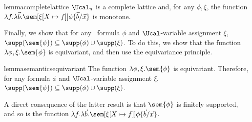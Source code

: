 \begin{restatable}{lemma}{completelattice}\label{lem:completelattice}
$\Ucal_n$ is a complete lattice and,
for any $\phi, \xi$,
 the function $\lambda f.\lambda \vec b.\sem[{\xi[X\mapsto f]}]{\phi\{\vec b/\vec x\}}$ is monotone.
\end{restatable}

Finally, we show that for any \fhml\ formula $\phi$ and $\Ucal$-variable assignment $\xi$,  $\supp(\sem{\phi}) \subseteq \supp(\phi) \cup \supp(\xi)$. 
To do this, we show that the function $\lambda \phi, \xi.\sem{\phi}$ is equivariant, and then use the equivariance principle.

\begin{restatable}{lemma}{semanticsequivariant}\label{lem:semanticsequivariant}
    The function $\lambda \phi, \xi.\sem{\phi}$ is equivariant.
    Therefore, 
for any formula $\phi$ and $\Ucal$-variable assignment $\xi$, $\supp(\sem{\phi}) \subseteq \supp(\phi) \cup \supp(\xi)$.
\end{restatable}


A direct consequence of the latter result is that $\sem{\phi}$ is finitely supported, and so is the function $\lambda f.\lambda \vec b.\sem[{\xi[X \mapsto f]}]{\phi\{\vec b/\vec x\}}$.

